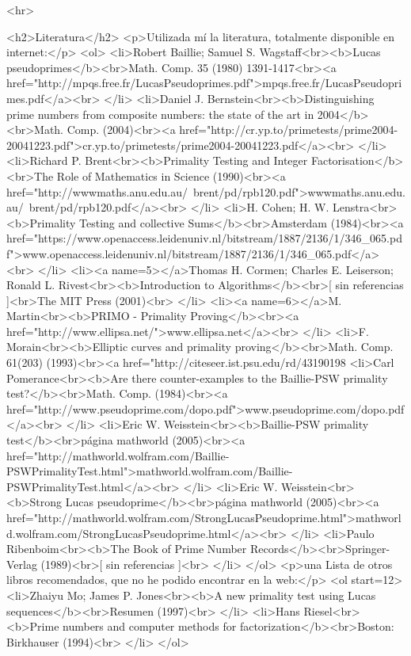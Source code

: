 <hr>

<h2>Literatura</h2>
<p>Utilizada mí la literatura, totalmente disponible en internet:</p>
<ol>
<li>Robert Baillie; Samuel S. Wagstaff<br><b>Lucas pseudoprimes</b><br>Math. Comp. 35 (1980) 1391-1417<br><a href="http://mpqs.free.fr/LucasPseudoprimes.pdf">mpqs.free.fr/LucasPseudoprimes.pdf</a><br> </li>
<li>Daniel J. Bernstein<br><b>Distinguishing prime numbers from composite numbers: the state of the art in 2004</b><br>Math. Comp. (2004)<br><a href="http://cr.yp.to/primetests/prime2004-20041223.pdf">cr.yp.to/primetests/prime2004-20041223.pdf</a><br> </li>
<li>Richard P. Brent<br><b>Primality Testing and Integer Factorisation</b><br>The Role of Mathematics in Science (1990)<br><a href="http://wwwmaths.anu.edu.au/~brent/pd/rpb120.pdf">wwwmaths.anu.edu.au/~brent/pd/rpb120.pdf</a><br> </li>
<li>H. Cohen; H. W. Lenstra<br><b>Primality Testing and collective Sums</b><br>Amsterdam (1984)<br><a href="https://www.openaccess.leidenuniv.nl/bitstream/1887/2136/1/346_065.pdf">www.openaccess.leidenuniv.nl/bitstream/1887/2136/1/346_065.pdf</a><br> </li>
<li><a name=5></a>Thomas H. Cormen; Charles E. Leiserson; Ronald L. Rivest<br><b>Introduction to Algorithms</b><br>[ sin referencias ]<br>The MIT Press (2001)<br> </li>
<li><a name=6></a>M. Martin<br><b>PRIMO - Primality Proving</b><br><a href="http://www.ellipsa.net/">www.ellipsa.net</a><br> </li>
<li>F. Morain<br><b>Elliptic curves and primality proving</b><br>Math. Comp. 61(203) (1993)<br><a href="http://citeseer.ist.psu.edu/rd/43190198%
<li>Carl Pomerance<br><b>Are there counter-examples to the Baillie-PSW primality test?</b><br>Math. Comp. (1984)<br><a href="http://www.pseudoprime.com/dopo.pdf">www.pseudoprime.com/dopo.pdf</a><br> </li>
<li>Eric W. Weisstein<br><b>Baillie-PSW primality test</b><br>página mathworld (2005)<br><a href="http://mathworld.wolfram.com/Baillie-PSWPrimalityTest.html">mathworld.wolfram.com/Baillie-PSWPrimalityTest.html</a><br> </li>
<li>Eric W. Weisstein<br><b>Strong Lucas pseudoprime</b><br>página mathworld (2005)<br><a href="http://mathworld.wolfram.com/StrongLucasPseudoprime.html">mathworld.wolfram.com/StrongLucasPseudoprime.html</a><br> </li>
<li>Paulo Ribenboim<br><b>The Book of Prime Number Records</b><br>Springer-Verlag (1989)<br>[ sin referencias ]<br> </li>
</ol>
<p>una Lista de otros libros recomendados, que no he podido encontrar en la web:</p>
<ol start=12>
<li>Zhaiyu Mo; James P. Jones<br><b>A new primality test using Lucas sequences</b><br>Resumen (1997)<br> </li>
<li>Hans Riesel<br><b>Prime numbers and computer methods for factorization</b><br>Boston: Birkhauser (1994)<br> </li>
</ol>